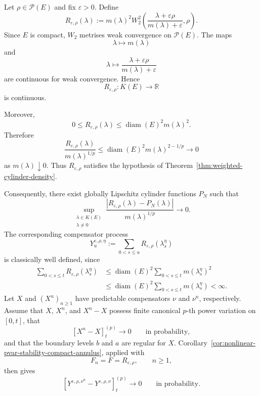 \documentclass[a4paper,10pt]{article}
\begin{document}
Let
$
        \rho\in\mathcal P(E)
$
and fix \(\varepsilon>0\). Define
\[
R_{\varepsilon,\rho}(\lambda)
:=
m(\lambda)^2
W_2^2
\left(
        \frac{\lambda+\varepsilon\rho}
             {m(\lambda)+\varepsilon},
        \rho
\right).
\]
Since \(E\) is compact, \(W_2\) metrises weak convergence on
\(\mathcal P(E)\). The maps
\[
        \lambda\longmapsto m(\lambda)
\]
and
\[
        \lambda
        \longmapsto
        \frac{\lambda+\varepsilon\rho}
             {m(\lambda)+\varepsilon}
\]
are continuous for weak convergence. Hence
\[
        R_{\varepsilon,\rho}:K(E)\longrightarrow\mathbb R
\]
is continuous.

Moreover,
\[
        0
        \le
        R_{\varepsilon,\rho}(\lambda)
        \le
        \operatorname{diam}(E)^2m(\lambda)^2.
\]
Therefore
\[
\frac{
R_{\varepsilon,\rho}(\lambda)
}{
m(\lambda)^{1/p}
}
\le
\operatorname{diam}(E)^2
m(\lambda)^{2-1/p}
\longrightarrow0
\]
as \(m(\lambda)\downarrow0\). Thus
\(R_{\varepsilon,\rho}\) satisfies the hypothesis of
Theorem~\ref{thm:weighted-cylinder-density}.

Consequently, there exist globally Lipschitz cylinder functions
\(P_N\) such that
\[
\sup_{\substack{\lambda\in K(E)\\\lambda\ne0}}
\frac{
|R_{\varepsilon,\rho}(\lambda)-P_N(\lambda)|
}{
m(\lambda)^{1/p}
}
\longrightarrow0.
\]
The corresponding compensator process
\[
        Y_u^{\varepsilon,\rho,\eta}
        :=
        \sum_{0<s\le u}
        R_{\varepsilon,\rho}(\lambda_s^\eta)
\]
is classically well defined, since
\[
\begin{aligned}
\sum_{0<s\le t}
R_{\varepsilon,\rho}(\lambda_s^\eta)
&\le
\operatorname{diam}(E)^2
\sum_{0<s\le t}m(\lambda_s^\eta)^2
\\
&\le
\operatorname{diam}(E)^2
\sum_{0<s\le t}m(\lambda_s^\eta)
<
\infty.
\end{aligned}
\]
Let \(X\) and \((X^n)_{n\ge1}\) have predictable compensators
\(\nu\) and \(\nu^n\), respectively. Assume that \(X\), \(X^n\), and
\(X^n-X\) possess finite canonical \(p\)-th power variation on
\([0,t]\), that
\[
        [X^n-X]^{(p)}_t
        \longrightarrow0
        \qquad\text{in probability},
\]
and that the boundary levels \(b\) and \(a\) are regular for \(X\).
Corollary~\ref{cor:nonlinear-pvar-stability-compact-annulus}, applied with
\[
        F_n=F=R_{\varepsilon,\rho},
        \qquad n\ge1,
\]
then gives
\[
\left[
        Y^{\varepsilon,\rho,\nu^n}
        -
        Y^{\varepsilon,\rho,\nu}
\right]^{(p)}_t
\longrightarrow0
\qquad\text{in probability}.
\]
\end{document}
